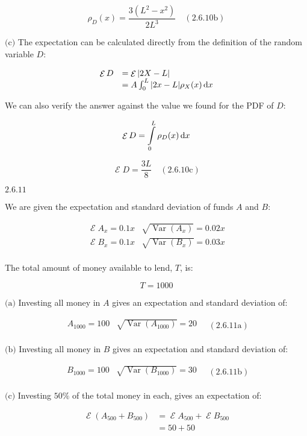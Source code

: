 \documentclass{article}
\newcommand{\problem}[2]{$\boxed{\text{#1.#2}}$}
\newcommand{\subproblem}[3]{$\boxed{\text{(#3)}}$}
\newcommand{\subsolution}[4]{\boxed{#4\quad(\text{#1.#2#3})}}
\renewcommand{\d}[1]{\,\textnormal{d}#1}
\DeclareMathOperator{\var}{Var}
\DeclareMathOperator{\E}{\mathcal{E}}
\begin{document}
\[
\subsolution{2.6}{10}{b}{\rho_D(x)=\dfrac{3\left(L^2-x^2\right)}{2L^3}}
\]

%
\subproblem{2.6}{10}{c} The expectation can be calculated directly
from the definition of the random variable $D$:

\[
\begin{array}{rl}
\E D&=\E|2X-L| \\
&=A\int_0^L |2x-L| \rho_X(x)\d{x} \\
\end{array}
\]

We can also verify the answer against the value we found for the PDF
of $D$:

\[
\E D =\int\limits_0^L \rho_D(x)\d{x}
\]

\[
\subsolution{2.6}{10}{c}{\E D=\frac{3L}{8}}
\]

%
\problem{2.6}{11}

We are given the expectation and standard deviation of funds $A$ and
$B$:

\[
\begin{array}{cc}
\E A_x=0.1 x & \sqrt{\var(A_x)}=0.02x \\
\E B_x=0.1 x & \sqrt{\var(B_x)}=0.03x \\
\end{array}
\]

The total amount of money available to lend, $T$, is:

\[
T=1000
\]

%
\subproblem{2.6}{11}{a} Investing all money in $A$ gives an
expectation and standard deviation of:

\[
\subsolution{2.6}{11}{a}{\begin{array}{cc}
A_{1000} = 100 & \sqrt{\var(A_{1000})} = 20 \\
\end{array}}
\]

%
\subproblem{2.6}{11}{b} Investing all money in $B$ gives an
expectation and standard deviation of:

\[
\subsolution{2.6}{11}{b}{\begin{array}{cc}
B_{1000} = 100 & \sqrt{\var(B_{1000})} = 30 \\
\end{array}}
\]

%
\subproblem{2.6}{11}{c} Investing $50\%$ of the total money in each,
gives an expectation of:

\[
\begin{array}{rl}
\E(A_{500}+B_{500}) &= \E A_{500} + \E B_{500} \\
&= 50 + 50 \\
\end{array}
\]
\end{document}
